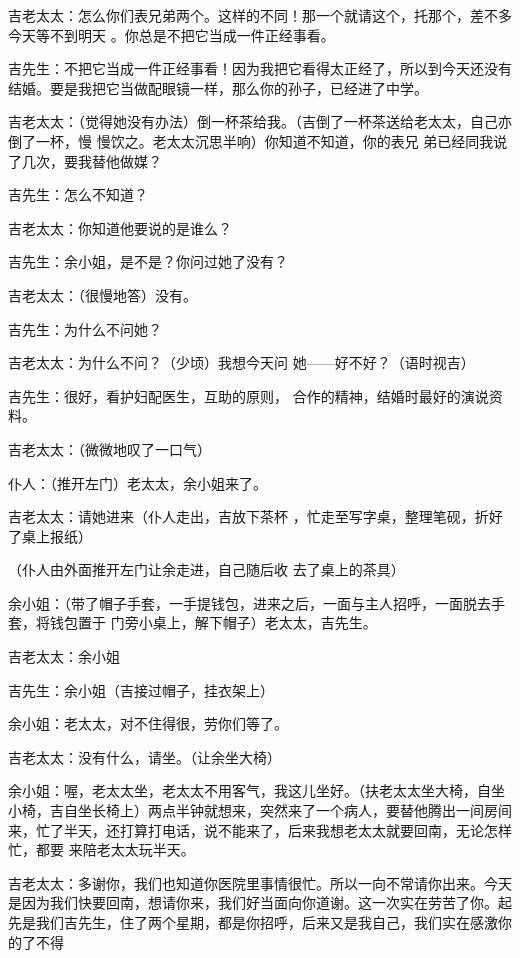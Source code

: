\documentclass{article}
\begin{document}
吉老太太：怎么你们表兄弟两个。这样的不同！那一个就请这个，托那个，差不多今天等不到明天
。你总是不把它当成一件正经事看。 

吉先生：不把它当成一件正经事看！因为我把它看得太正经了，所以到今天还没有结婚。要是我把它当做配眼镜一样，那么你的孙子，已经进了中学。

吉老太太：（觉得她没有办法）倒一杯茶给我。（吉倒了一杯茶送给老太太，自己亦倒了一杯，慢
\newpage
慢饮之。老太太沉思半响）你知道不知道，你的表兄
弟已经同我说了几次，要我替他做媒？ 


吉先生：怎么不知道？ 



吉老太太：你知道他要说的是谁么？ 

吉先生：余小姐，是不是？你问过她了没有？


吉老太太：（很慢地答）没有。 


吉先生：为什么不问她？ 

吉老太太：为什么不问？（少顷）我想今天问
她——好不好？（语时视吉） 

吉先生：很好，看护妇配医生，互助的原则，
合作的精神，结婚时最好的演说资料。 


\newpage

吉老太太：（微微地叹了一口气） 


仆人：（推开左门）老太太，余小姐来了。 

吉老太太：请她进来（仆人走出，吉放下茶杯
，忙走至写字桌，整理笔砚，折好了桌上报纸） 

（仆人由外面推开左门让余走进，自己随后收
去了桌上的茶具） 

余小姐：（带了帽子手套，一手提钱包，进来之后，一面与主人招呼，一面脱去手套，将钱包置于
门旁小桌上，解下帽子）老太太，吉先生。 


吉老太太：余小姐 


吉先生：余小姐（吉接过帽子，挂衣架上） 

余小姐：老太太，对不住得很，劳你们等了。

吉老太太：没有什么，请坐。（让余坐大椅）

\newpage

余小姐：喔，老太太坐，老太太不用客气，我这儿坐好。（扶老太太坐大椅，自坐小椅，吉自坐长椅上）两点半钟就想来，突然来了一个病人，要替他腾出一间房间来，忙了半天，还打算打电话，说不能来了，后来我想老太太就要回南，无论怎样忙，都要
来陪老太太玩半天。 

吉老太太：多谢你，我们也知道你医院里事情很忙。所以一向不常请你出来。今天是因为我们快要回南，想请你来，我们好当面向你道谢。这一次实在劳苦了你。起先是我们吉先生，住了两个星期，都是你招呼，后来又是我自己，我们实在感激你的了不得
\end{document}

